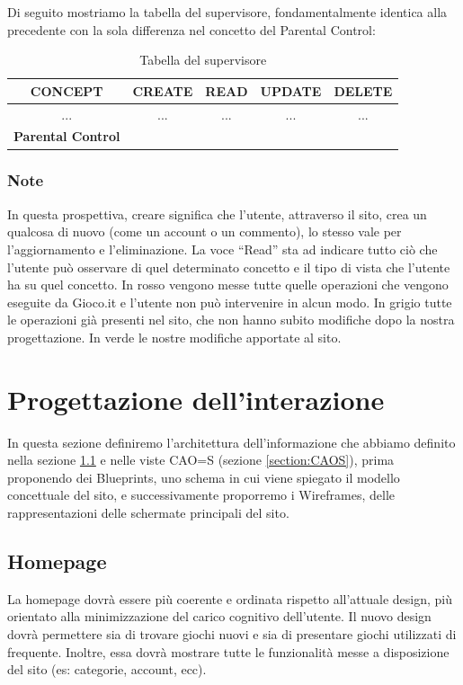 \documentclass[../Report.tex]{subfiles}
\begin{document}
    Di seguito mostriamo la tabella del supervisore, fondamentalmente identica alla precedente con la sola differenza nel concetto del Parental Control:

    \begin{table}[H]
        \begin{tabular}{|c|c|c|c|c|}
            \hline
            \textbf{CONCEPT} & \textbf{CREATE} & \textbf{READ} & \textbf{UPDATE} & \textbf{DELETE} \\
            \hline
            ... & ... & ... & ... & ... \\
            \hline
            \textbf{Parental Control} & \cellcolor{green} & \cellcolor{green} & \cellcolor{green} & \cellcolor{green} \\
            \hline
        \end{tabular}
        \caption{\label{tab:supervisore}Tabella del supervisore}
    \end{table}
    
    \subsubsection{Note}
    In questa prospettiva, creare significa che l’utente, attraverso il sito, crea un qualcosa di nuovo (come un account o un commento), lo stesso vale per l’aggiornamento e l’eliminazione. La voce “Read” sta ad indicare tutto ciò che l’utente può osservare di quel determinato concetto e il tipo di vista che l'utente ha su quel concetto. In rosso vengono messe tutte quelle operazioni che vengono eseguite da Gioco.it e l’utente non può intervenire in alcun modo. In grigio tutte le operazioni già presenti nel sito, che non hanno subito modifiche dopo la nostra progettazione. In verde le nostre modifiche apportate al sito.

    \section{Progettazione dell'interazione}
    In questa sezione definiremo l'architettura dell'informazione che abbiamo definito nella sezione \ref{} e nelle viste CAO=S (sezione \ref{section:CAOS}), prima proponendo dei Blueprints, uno schema in cui viene spiegato il modello concettuale del sito, e successivamente proporremo i Wireframes, delle rappresentazioni delle schermate principali del sito.

    \subsection{Homepage}
    La homepage dovrà essere più coerente e ordinata rispetto all'attuale design, più orientato alla minimizzazione del carico cognitivo dell'utente. Il nuovo design dovrà permettere sia di trovare giochi nuovi e sia di presentare giochi utilizzati di frequente. Inoltre, essa dovrà mostrare tutte le funzionalità messe a disposizione del sito (es: categorie, account, ecc).
\end{document}
